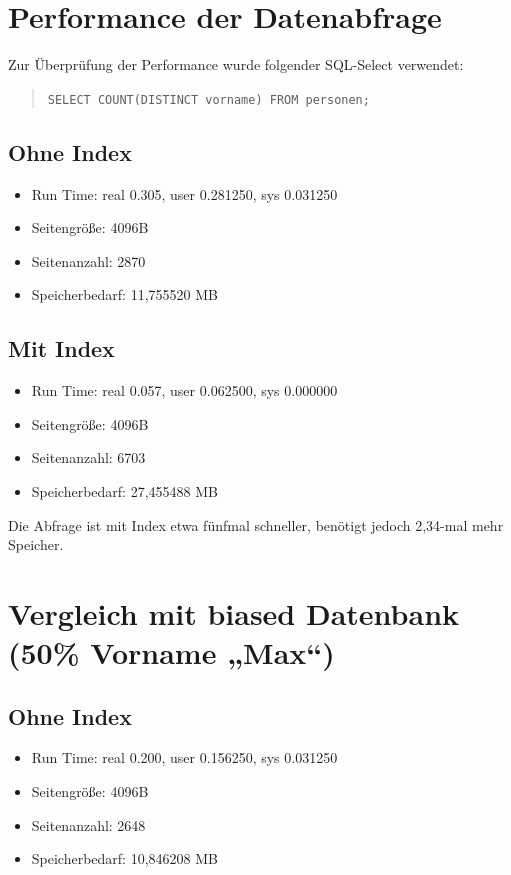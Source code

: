 \documentclass[a4paper,12pt]{article}
\begin{document}
\section*{Performance der Datenabfrage}

Zur Überprüfung der Performance wurde folgender SQL-Select verwendet:

\begin{quote}
\texttt{SELECT COUNT(DISTINCT vorname) FROM personen;}
\end{quote}

\subsection*{Ohne Index}
\begin{itemize}
    \item Run Time: real 0.305, user 0.281250, sys 0.031250
    \item Seitengröße: 4096B
    \item Seitenanzahl: 2870
    \item Speicherbedarf: 11{,}755520 MB
\end{itemize}

\subsection*{Mit Index}
\begin{itemize}
    \item Run Time: real 0.057, user 0.062500, sys 0.000000
    \item Seitengröße: 4096B
    \item Seitenanzahl: 6703
    \item Speicherbedarf: 27{,}455488 MB
\end{itemize}

Die Abfrage ist mit Index etwa fünfmal schneller, benötigt jedoch 2{,}34-mal mehr Speicher.

\section*{Vergleich mit biased Datenbank (50\% Vorname „Max“)}

\subsection*{Ohne Index}
\begin{itemize}
    \item Run Time: real 0.200, user 0.156250, sys 0.031250
    \item Seitengröße: 4096B
    \item Seitenanzahl: 2648
    \item Speicherbedarf: 10{,}846208 MB
\end{itemize}
\end{document}
